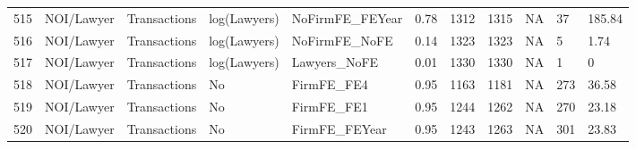 \begin{table}[ht]
\begin{tabular}{rllllllllll}
  515 & NOI/Lawyer & Transactions & log(Lawyers) & NoFirmFE\_FEYear & 0.78 & 1312 & 1315 & NA & 37 & 185.84 \\ 
  516 & NOI/Lawyer & Transactions & log(Lawyers) & NoFirmFE\_NoFE & 0.14 & 1323 & 1323 & NA & 5 & 1.74 \\ 
  517 & NOI/Lawyer & Transactions & log(Lawyers) & Lawyers\_NoFE & 0.01 & 1330 & 1330 & NA & 1 & 0 \\ 
  518 & NOI/Lawyer & Transactions & No & FirmFE\_FE4 & 0.95 & 1163 & 1181 & NA & 273 & 36.58 \\ 
  519 & NOI/Lawyer & Transactions & No & FirmFE\_FE1 & 0.95 & 1244 & 1262 & NA & 270 & 23.18 \\ 
  520 & NOI/Lawyer & Transactions & No & FirmFE\_FEYear & 0.95 & 1243 & 1263 & NA & 301 & 23.83 \\ 
   \hline
\end{tabular}
\end{table}
